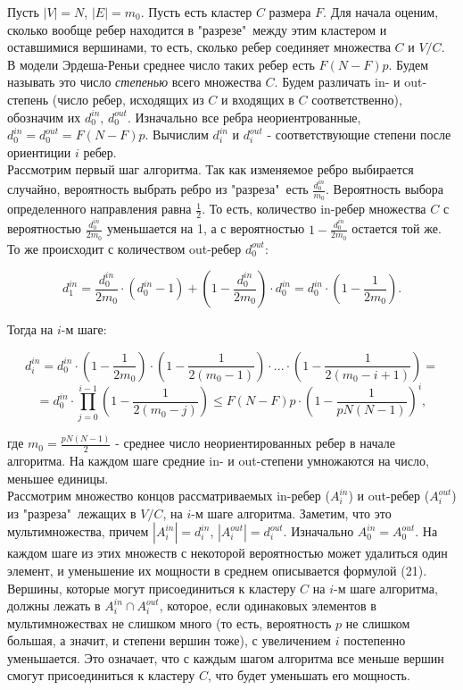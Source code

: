 Пусть $|V|=N$, $|E|=m_0$. Пусть есть кластер $C$ размера $F$. Для начала оценим, сколько вообще ребер находится в "разрезе"\ между этим кластером и оставшимися вершинами, то есть, сколько ребер соединяет множества $C$ и $V/C$. В модели Эрдеша-Реньи среднее число таких ребер есть $F(N-F)p$. Будем называть это число \textit{степенью} всего множества $C$. Будем различать in- и out-степень (число ребер, исходящих из $C$ и входящих в $C$ соответственно), обозначим их $d_0^{in}$, $d_0^{out}$. Изначально все ребра неориентрованные, $d_0^{in}= d_0^{out}=F(N-F)p$. Вычислим $d_i^{in}$ и $d_i^{out}$ - соответствующие степени после ориентиции $i$ ребер.\\

Рассмотрим первый шаг алгоритма. Так как изменяемое ребро выбирается случайно, вероятность выбрать ребро из "разреза"\ есть $\frac{d^{in}_0}{m_0}$. Вероятность выбора определенного направления равна $\frac{1}{2}$. То есть, количество in-ребер множества $C$ с вероятностью $\frac{d_0^{in}}{2m_0}$ уменьшается на 1, а с вероятностью $1-\frac{d_0^{in}}{2m_0}$ остается той же. То же происходит с количеством out-ребер $d_0^{out}$:

\begin{equation}
	d_1^{in}=\frac{d_0^{in}}{2m_0}\cdot (d_0^{in}-1)+(1-\frac{d_0^{in}}{2m_0})\cdot d_0^{in} = d_0^{in}\cdot (1-\frac{1}{2m_0}).
\end{equation}

Тогда на $i$-м шаге:

\begin{equation*}
	d_i^{in}=d_0^{in}\cdot (1-\frac{1}{2m_0})\cdot(1-\frac{1}{2(m_0-1)})\cdot...\cdot (1-\frac{1}{2(m_0-i+1)}) =
\end{equation*}
\begin{equation}
	 =d_0^{in}\cdot\prod_{j=0}^{i-1}(1-\frac{1}{2(m_0-j)})\leq F(N-F)p\cdot(1-\frac{1}{pN(N-1)})^i,
\end{equation}

где $m_0=\frac{pN(N-1)}{2}$ - среднее число неориентированных ребер в начале алгоритма. На каждом шаге средние in- и out-степени умножаются на число, меньшее единицы.\\

Рассмотрим множество концов рассматриваемых in-ребер ($A_i^{in}$) и out-ребер ($A_i^{out}$) из "разреза"\, лежащих в $V/C$, на $i$-м шаге алгоритма. Заметим, что это мультимножества, причем $|A_i^{in}|=d_i^{in}$, $|A_i^{out}|=d_i^{out}$. Изначально $A_0^{in}=A_0^{out}$. На каждом шаге из этих множеств с некоторой вероятностью может удалиться один элемент, и уменьшение их мощности в среднем описывается формулой (21). Вершины, которые могут присоединиться к кластеру $C$ на $i$-м шаге алгоритма, должны лежать в $A_i^{in}\cap A_i^{out}$, которое, если одинаковых элементов в мультимножествах не слишком много (то есть, вероятность $p$ не слишком большая, а значит, и степени вершин тоже), с увеличением $i$ постепенно уменьшается. Это означает, что с каждым шагом алгоритма все меньше вершин смогут присоединиться к кластеру $C$, что будет уменьшать его мощность.\\

